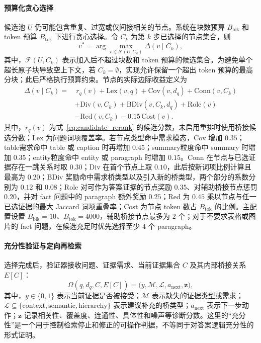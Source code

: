 \paragraph{预算化贪心选择}
候选池 $U$ 仍可能包含重复、过宽或仅间接相关的节点。系统在块数预算 $B_{\mathrm{blk}}$ 和 token 预算 $B_{\mathrm{tok}}$ 下进行贪心选择。令 $C_k$ 为第 $k$ 步已选择的节点集合，则
\begin{equation}
\label{eq:budgeted_selection}
v^*=\arg\max_{v\in\mathcal{F}(U,C_k)}
\Delta(v\mid C_k),
\end{equation}
其中，$\mathcal{F}(U,C_k)$ 表示加入后不超过块数和 token 预算的候选集合。为避免单个超长原子块导致空上下文，若 $C_k=\emptyset$，实现允许保留一个超出 token 预算的最高分块；此后严格执行预算约束。节点的实际边际收益定义为
\begin{equation}
\label{eq:selector_score}
\begin{aligned}
\Delta(v\mid C_k)=&
\ r_q(v)+\mathrm{Lex}(v,q)+\mathrm{Cov}(v,d_q)
+\mathrm{Conn}(v,C_k)\\
&+\mathrm{Div}(v,C_k)+\mathrm{BDiv}(v,C_k,d_q)
+\mathrm{Role}(v)\\
&-\mathrm{Red}(v,C_k)-0.15\,\mathrm{Cost}(v).
\end{aligned}
\end{equation}
其中，$r_q(v)$ 为式~\eqref{eq:candidate_rerank} 的候选分数，未启用重排时使用桥接候选分数；$\mathrm{Lex}$ 为问题词项覆盖率。若节点类型命中需求模态，$\mathrm{Cov}$ 增加 $0.35$；table需求命中 table 或 caption 时再增加 $0.45$；summary粒度命中 summary 时增加 $0.35$；entity粒度命中 entity 或 paragraph 时增加 $0.15$。$\mathrm{Conn}$ 在节点与已选证据存在一跳关系时取 $0.30$；$\mathrm{Div}$ 在首个节点上取 $0.10$，此后按新词项比例计算且最高为 $0.20$；$\mathrm{BDiv}$ 奖励命中需求桥类型以及引入新的桥类型，两个部分的系数分别为 $0.12$ 和 $0.08$；$\mathrm{Role}$ 对可作为答案证据的节点奖励 $0.35$、对辅助桥接节点惩罚 $0.20$，并对 fact 问题中的 paragraph 额外奖励 $0.25$；$\mathrm{Red}$ 为 $0.45$ 乘以节点与任一已选证据的最大 Jaccard 词项重叠率；$\mathrm{Cost}$ 为节点 token 数占 $B_{\mathrm{tok}}$ 的比例。主配置设置 $B_{\mathrm{blk}}=10$、$B_{\mathrm{tok}}=4000$，辅助桥接节点最多为 $2$ 个；对于不要求表格或图片的 fact 问题，在候选充足时优先选择至少 $4$ 个 paragraph。

\paragraph{充分性验证与定向再检索}
选择完成后，验证器接收问题、证据需求、当前证据集合 $C$ 及其内部桥接关系 $E[C]$：
\begin{equation}
\label{eq:sufficiency_verifier}
\Omega(q,d_q,C,E[C])
=\bigl(y,\mathcal{M},\mathcal{L},a_{\mathrm{next}},\mathbf{z}\bigr),
\end{equation}
其中，$y\in\{0,1\}$ 表示当前证据是否被接受；$\mathcal{M}$ 表示缺失的证据类型或需求；$\mathcal{L}\subseteq\{\mathrm{context},\mathrm{semantic},\mathrm{hierarchy}\}$ 表示建议补充的桥类型；$a_{\mathrm{next}}$ 表示下一步动作；$\mathbf{z}$ 记录相关性、覆盖度、连通性、具体性和噪声等诊断分数。这里的``充分性''是一个用于控制检索停止和修正的可操作判据，不等同于对答案逻辑充分性的形式证明。

